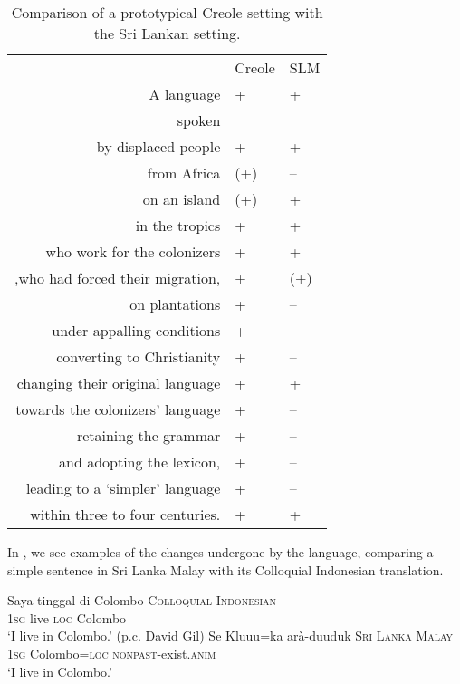 \begin{table}
\centering
\begin{tabular} {rll}
				&      Creole &      SLM \\
A language			&      +	&      + 	\\  
spoken\\
by displaced people		&   +  	&  +    	\\  
from Africa		&   (+)  	&   --   	\\  
on an island		&   (+)  	&   +   	\\  
in the tropics		&    + 	&  +    	\\  
who work for the colonizers		&  +   	&  +    	\\  
,who had forced their migration,		&  +   	&  (+)    	\\  
on plantations		&   +  	& --     	\\  
under appalling conditions		&  +   	&  --    	\\  
converting to Christianity		&  +   	&  --    	\\  
changing their original language		&  +   	&  +    	\\  
towards the colonizers' language		&  +   	& --     	\\  
retaining the grammar		&   +  	&  --    	\\  
and adopting the lexicon,		&   +  	&  --    	\\  
leading to a `simpler' language		&   +  	&  --    	\\  
within three to four centuries.		&   +  	&  +    	\\  
\end{tabular}
\caption{Comparison of a prototypical Creole setting with the Sri Lankan setting.}
\label{intro:tab:creoleslm}
\end{table}

In , we see examples of the changes undergone by the language, comparing a simple sentence in Sri Lanka Malay with its Colloquial Indonesian translation.

\ea\label{ex:intro:intro}
\ea
\gll Saya tinggal di Colombo \textsc{Colloquial Indonesian}\\
      1\textsc{sg} live \textsc{loc} Colombo\\
`I live in Colombo.' (p.c. David Gil)
\ex
\gll Se Kluu{\umb}u=ka arà-duuduk \textsc{Sri Lanka Malay}\\
     1\textsc{sg} Colombo=\textsc{loc} \textsc{nonpast}-exist.\textsc{anim} \\  
      `I live in Colombo.'
\z
\z


